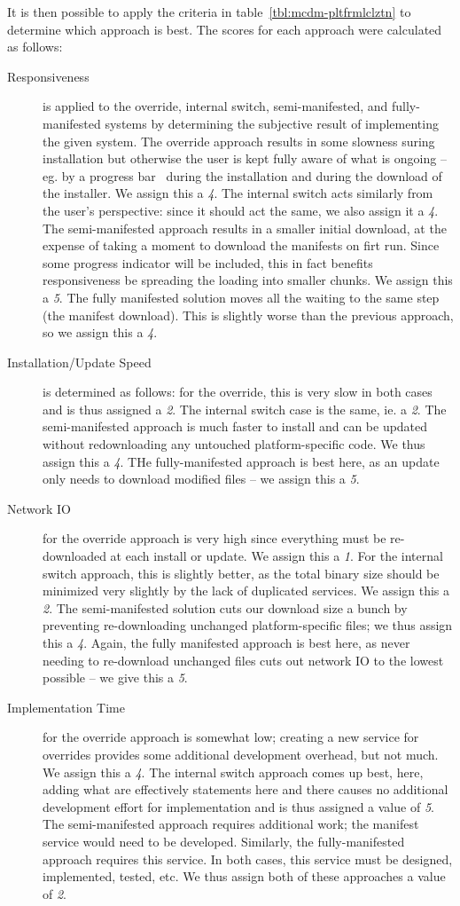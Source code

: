 \documentclass[12pt]{article}
\begin{document}
It is then possible to apply the criteria in table~\ref{tbl:mcdm-pltfrmlclztn} to determine which approach is best. The scores for each approach were calculated as follows:
\begin{description}
\item[Responsiveness] is applied to the override, internal switch, semi-manifested, and fully-manifested systems by determining the subjective result of implementing the given system. The override approach results in some slowness suring installation but otherwise the user is kept fully aware of what is ongoing -- eg. by a progress bar~\cite{progressbar} during the installation and during the download of the installer. We assign this a {\it 4}. The internal switch acts similarly from the user's perspective: since it should act the same, we also assign it a {\it 4}. The semi-manifested approach results in a smaller initial download, at the expense of taking a moment to download the manifests on firt run. Since some progress indicator will be included, this in fact benefits responsiveness be spreading the loading into smaller chunks. We assign this a {\it 5}. The fully manifested solution moves all the waiting to the same step (the manifest download). This is slightly worse than the previous approach, so we assign this a {\it 4}.
\item[Installation/Update Speed] is determined as follows: for the override, this is very slow in both cases and is thus assigned a {\it 2}. The internal switch case is the same, ie. a {\it 2}. The semi-manifested approach is much faster to install and can be updated without redownloading any untouched platform-specific code. We thus assign this a {\it 4}. THe fully-manifested approach is best here, as an update only needs to download modified files -- we assign this a {\it 5}.
\item[Network IO] for the override approach is very high since everything must be re-downloaded at each install or update. We assign this a {\it 1}. For the internal switch approach, this is slightly better, as the total binary size should be minimized very slightly by the lack of duplicated services. We assign this a {\it 2}. The semi-manifested solution cuts our download size a bunch by preventing re-downloading unchanged platform-specific files; we thus assign this a {\it 4}. Again, the fully manifested approach is best here, as never needing to re-download unchanged files cuts out network IO to the lowest possible -- we give this a {\it 5}.
\item[Implementation Time] for the override approach is somewhat low; creating a new service for overrides provides some additional development overhead, but not much. We assign this a {\it 4}. The internal switch approach comes up best, here, adding what are effectively \rmfamily{} statements here and there causes no additional development effort for implementation and is thus assigned a value of {\it 5}. The semi-manifested approach requires additional work; the manifest service would need to be developed. Similarly, the fully-manifested approach requires this service. In both cases, this service must be designed, implemented, tested, etc. We thus assign both of these approaches a value of {\it 2}.

\end{description}
\end{document}
